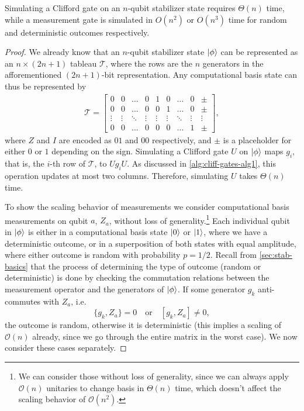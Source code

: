 \begin{thm}\label{thm:sim-stab-comp}
  Simulating a Clifford gate on an $n$-qubit stabilizer state requires $\Theta(n)$
  time, while a measurement gate is simulated in $O(n^2)$ or $O(n^3)$ time for
  random and deterministic outcomes respectively.
\end{thm}
\begin{proof}
  We already know that an $n$-qubit stabilizer state $\ket{\phi}$ can be represented as an
  $n\times(2n+1)$ tableau $\mathcal{T}$, where the rows are the $n$ generators in the
  afforementioned $(2n+1)$-bit representation. Any computational basis state can
  thus be represented by
  \begin{align}
    \mathcal{T} = 
    \left[
      \begin{array}{cccc|cccc|c}
        0 & 0 & \ldots & 0 & 1 & 0 & \ldots & 0 & \pm \\
        0 & 0 & \ldots & 0 & 0 & 1 & \ldots & 0 & \pm \\
        \vdots & \vdots & \ddots & \vdots & \vdots & \vdots & \ddots & \vdots & \vdots \\
        0 & 0 & \ldots & 0 & 0 & 0 & \ldots & 1 & \pm
      \end{array}
    \right]
  ,\end{align}
  where $Z$ and $I$ are encoded as $01$ and $00$ respectively, and $\pm$ is a
  placeholder for either $0$ or $1$ depending on the sign. Simulating a
  Clifford gate $U$ on $\ket{\phi}$ maps $g_i$, that is, the $i$-th row of
  $\mathcal{T}$, to $U g_i U$. As discussed in \cref{alg:cliff-gates-alg1},
  this operation updates at most two columns. Therefore, simulating $U$ takes
  $\Theta(n)$ time.

  To show the scaling behavior of measurements we consider computational basis
  measurements on qubit $a$, $Z_a$, without loss of generality.\footnote{We can
    consider those without loss of generality, since we can always apply
    $\mathcal{O}(n)$ unitaries to change basis in $\Theta(n)$ time, which
  doesn't affect the scaling behavior of $\mathcal{O}(n^2)$.} Each individual
  qubit in $\ket{\phi}$ is either in a computational basis state $\ket{0}$ or
  $\ket{1}$, where we have a deterministic outcome, or in a superposition of
  both states with equal amplitude, where either outcome is random with
  probability $p=1 / 2$. Recall from \cref{sec:stab-basics} that the process of
  determining the type of outcome (random or deterministic) is done by checking
  the commutation relations between the measurement operator and the generators
of $\ket{\phi}$. If some generator $g_k$ anti-commutes with $Z_a$, i.e.
\[ \{g_k, Z_a\} =0 \quad{\text{or}}\quad [g_k, Z_a] \neq 0,\]
the outcome is random,
  otherwise it is deterministic (this implies a scaling of $\mathcal{O}(n)$
  already, since we go through the entire matrix in the worst case). We now
  consider these cases separately.
  

\end{proof}
